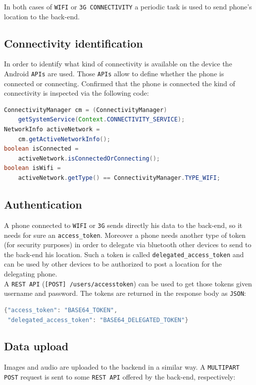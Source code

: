 \documentclass[conference]{IEEEtran}
\begin{document}
In both cases of \texttt{WIFI} or \texttt{3G CONNECTIVITY} a periodic task is used to send phone's location to the back-end.

\subsection{\textbf{Connectivity identification}}
In order to identify what kind of connectivity is available on the device the Android \texttt{APIs} are used. Those \texttt{APIs} allow to define whether the phone is connected or connecting. Confirmed that the phone is connected the kind of connectivity is inspected via the following code:

\begin{lstlisting}[language=Java, caption=Java code to define connectivity type]
ConnectivityManager cm = (ConnectivityManager)
	getSystemService(Context.CONNECTIVITY_SERVICE);
NetworkInfo activeNetwork = 
	cm.getActiveNetworkInfo();
boolean isConnected = 
	activeNetwork.isConnectedOrConnecting();
boolean isWifi = 
	activeNetwork.getType() == ConnectivityManager.TYPE_WIFI;
\end{lstlisting}

\subsection{\textbf{Authentication}}
A phone connected to \texttt{WIFI} or \texttt{3G} sends directly his data to the back-end, so it needs for sure an \texttt{access\_token}. Moreover a phone needs another type of token (for security purposes) in order to delegate via bluetooth other devices to send to the back-end his location. Such a token is called \texttt{delegated\_access\_token} and can be used by other devices to be authorized to post a location for the delegating phone.\\
A \texttt{REST API} (\texttt{[POST] /users/accesstoken}) can be used to get those tokens given username and password. The tokens are returned in the response body as \texttt{JSON}:

\begin{lstlisting}[language=Java, caption=Response body containing tokens]
{"access_token": "BASE64_TOKEN",
 "delegated_access_token": "BASE64_DELEGATED_TOKEN"}
\end{lstlisting}

\subsection{\textbf{Data upload}}
Images and audio are uploaded to the backend in a similar way. A \texttt{MULTIPART POST} request is sent to some \texttt{REST API} offered by the back-end, respectively:
\end{document}
